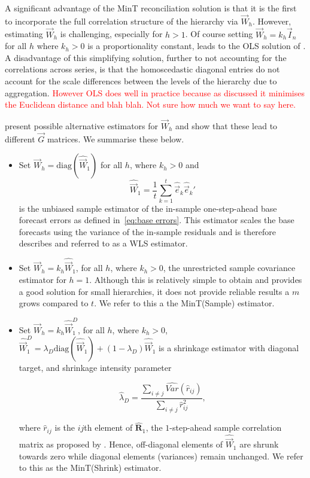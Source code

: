 \documentclass[graybox]{svmult}
\begin{document}
A significant advantage of the MinT reconciliation solution is that it is the first to incorporate the full correlation structure of the hierarchy via ${\vec{W}}_{h}$. However, estimating ${\vec{W}}_{h}$ is challenging, especially for $h>1$. Of course setting ${\vec{W}}_{h}=k_h\vec{I}_n$ for all $h$ where $k_h>0$ is a proportionality constant, leads to the OLS solution of \cite{HynEtAl2011}. A disadvantage of this simplifying solution, further to not accounting for the correlations across series, is that the homoscedastic diagonal entries do not account for the scale differences between the levels of the hierarchy due to aggregation. \textcolor{red}{However OLS does well in practice because as discussed it minimises the Euclidean distance and blah blah. Not sure how much we want to say here.}

\citet{WicEtAl2019} present possible alternative estimators for ${\vec{W}}_{h}$ and show that these lead to different $\vec{G}$ matrices. We summarise these below.

\begin{itemize}
    \item Set ${\vec{W}}_{h}=\text{diag}(\hat{\vec{W}}_{1})$ for all $h$, where $k_{h} > 0$ and
        $$
        \hat{\vec{W}}_{1} = \frac{1}{t}\sum_{k=1}^{t} \hat{\vec{e}}_{k}\hat{\vec{e}}_{k}'
        $$
        is the unbiased sample estimator of the in-sample one-step-ahead base forecast errors as defined in~\eqref{eq:base errors}. This estimator scales the base forecasts using the variance of the in-sample residuals and is therefore describes and referred to as a WLS estimator.
    \item  Set $\vec{W}_{h}=k_{h}\hat{\vec{W}}_{1}$, for all $h$, where $k_{h} > 0$, the unrestricted sample covariance estimator for $h=1$. Although this is relatively simple to obtain and provides a good solution for small hierarchies, it does not provide reliable results a $m$ grows compared to $t$. We refer to this a the MinT(Sample) estimator.
    \item Set $\vec{W}_{h}=k_{h}\hat{\vec{W}}_{1}^D$, for all $h$, where $k_{h} > 0$, $\hat{\vec{W}}^{D}_{1} = \lambda_{D} \text{diag}(\hat{\vec{W}}_{1}) + (1 - \lambda_{D})\hat{\vec{W}}_{1}$ is a shrinkage estimator with diagonal target, and shrinkage intensity parameter

        $$\hat{\lambda}_{D} = \frac{\sum_{i \ne j}\hat{Var}(\hat{r}_{ij})}{\sum_{i \ne j}\hat{r}_{ij}^2},$$


        where $\hat{r}_{ij}$ is the $ij$th element of $\hat{\bm{R}}_{1}$, the $1$-step-ahead sample correlation matrix as proposed by \citet{Schafer2005}. Hence, off-diagonal elements of $\hat{\vec{W}}_1$ are shrunk towards zero while diagonal elements (variances) remain unchanged. We refer to this as the MinT(Shrink) estimator.
\end{itemize}
\end{document}
